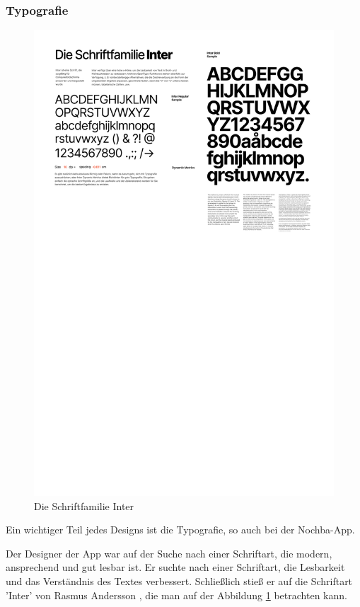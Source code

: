 \subsubsection{Typografie}
\begin{figure}[H]
  \centering
  \includegraphics[width=1\textwidth]{pics/font.png}
  \caption{Die Schriftfamilie Inter}
  \label{fig:font}
\end{figure}

Ein wichtiger Teil jedes Designs ist die Typografie, so auch bei der Nochba-App.

Der Designer der App war auf der Suche nach einer
Schriftart, die modern, ansprechend und gut lesbar ist. Er
suchte nach einer Schriftart, die Lesbarkeit und das
Verständnis des Textes verbessert. Schließlich stieß er auf
die Schriftart 'Inter' von Rasmus Andersson
\cite{inter-font}, die man auf der Abbildung \ref{fig:font}
betrachten kann.

